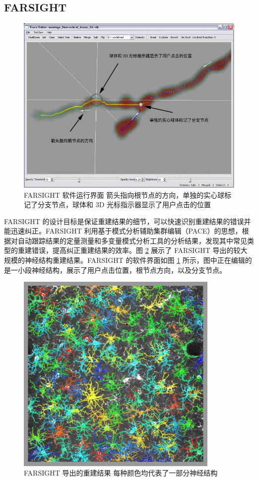 \subsection{FARSIGHT}
\begin{figure}[!ht]
\centering
\includegraphics[width=128mm]{images/FARSIGHT}
\caption{FARSIGHT 软件运行界面 箭头指向根节点的方向，单独的实心球标记了分支节点，球体和 3D 光标指示器显示了用户点击的位置}
\label{FARSIGHT}
\end{figure}

FARSIGHT 的设计目标是保证重建结果的细节，可以快速识别重建结果的错误并能迅速纠正。FARSIGHT 利用基于模式分析辅助集群编辑（PACE）的思想，根据对自动跟踪结果的定量测量和多变量模式分析工具的分析结果，发现其中常见类型的重建错误，提高纠正重建结果的效率。图 \ref{FARSIGHT-res} 展示了 FARSIGHT 导出的较大规模的神经结构重建结果。FARSIGHT 的软件界面如图 \ref{FARSIGHT} 所示，图中正在编辑的是一小段神经结构，展示了用户点击位置，根节点方向，以及分支节点。

\begin{figure}[!ht]
\centering
\includegraphics[width=98mm]{images/FARSIGHT-res}
\caption{FARSIGHT 导出的重建结果 每种颜色均代表了一部分神经结构}
\label{FARSIGHT-res}
\end{figure}

